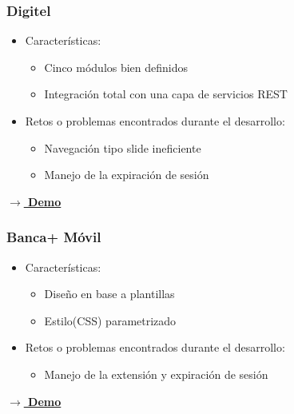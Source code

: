 \documentclass{beamer}
\begin{document}

\begin{frame}[fragile]
\frametitle{Digitel}
\begin{itemize}
	\item Características:
	\begin{itemize}
		\item Cinco módulos bien definidos
		\item Integración total con una capa de servicios REST
	\end{itemize}
	\item Retos o problemas encontrados durante el desarrollo: 
	\begin{itemize}
		\item Navegación tipo slide ineficiente
		\item Manejo de la expiración de sesión
	\end{itemize}
\end{itemize}


\textbf{\href{videos/demo-digitel.mp4}{$\rightarrow$ Demo}} 



\end{frame}






\begin{frame}[fragile]
\frametitle{Banca+ Móvil}
\begin{itemize}
	\item Características:
	\begin{itemize}
		\item Diseño en base a plantillas
		\item Estilo(CSS) parametrizado
	\end{itemize}
	\item Retos o problemas encontrados durante el desarrollo: 
	\begin{itemize}
		\item Manejo de la extensión y expiración de sesión
	\end{itemize}
\end{itemize}

\textbf{\href{videos/demo-banca.mp4}{$\rightarrow$ Demo}}


\end{frame}
\end{document}
